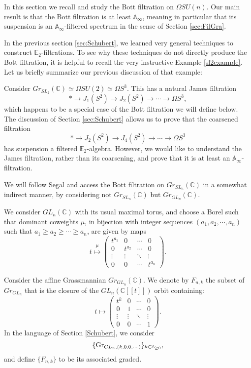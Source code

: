 In this section we recall and study the Bott filtration \cite{MitchellLoopGroup} on $\Omega SU(n)$.  Our main result is that the Bott filtration is at least $\mathbb{A}_\infty$, meaning in particular that its suspension is an $\mathbb{A}_\infty$-filtered spectrum in the sense of Section \ref{sec:FilGra}.

In the previous section \ref{sec:Schubert}, we learned very general techniques to construct $\mathbb{E}_2$-filtrations.  To see why these techniques do not directly produce the Bott filtration, it is helpful to recall the very instructive Example \ref{sl2example}.  Let us briefly summarize our previous discussion of that example:

\begin{rmk}
Consider $Gr_{SL_2}(\mathbb{C}) \simeq \Omega SU(2) \simeq \Omega S^3$.  This has a natural James filtration
$$* \longrightarrow J_1(S^2) \longrightarrow J_2(S^2) \longrightarrow \cdots \longrightarrow \Omega S^3,$$
which happens to be a special case of the Bott filtration we will define below.
The discussion of Section \ref{sec:Schubert} allows us to prove that the coarsened filtration
$$* \longrightarrow J_2(S^2) \longrightarrow J_4(S^2) \longrightarrow \cdots \longrightarrow \Omega S^3$$
has suspension a filtered $\mathbb{E}_2$-algebra.  However, we would like to understand the James filtration, rather than its coarsening, and prove that it is at least an $\mathbb{A}_\infty$-filtration.
\end{rmk}

We will follow Segal \cite{Segal} and access the Bott filtration on $Gr_{SL_n}(\mathbb{C})$ in a somewhat indirect manner, by considering not $Gr_{SL_n}(\mathbb{C})$ but $Gr_{GL_n}(\mathbb{C})$.

We consider $GL_n(\mathbb{C})$ with its usual maximal torus, and choose a Borel such that dominant coweights $\mu$, in bijection with integer sequences $(a_1,a_2,\cdots,a_n)$ such that $a_1 \ge a_2 \ge \cdots \ge a_n$, are given by maps
$$t \stackrel{\mu}{\mapsto} \left( \begin{array}{cccc} t^{a_1} & 0 & \cdots & 0 \\ 0 & t^{a_2} & \cdots & 0 \\ \vdots & \vdots & \ddots & \vdots \\ 0 & 0 & \cdots & t^{a_n} \end{array} \right).$$

\begin{dfn}
Consider the affine Grassmannian $Gr_{GL_n}(\mathbb{C})$.  We denote by $F_{n,k}$ the subset of $Gr_{GL_n}$ that is the closure of the $GL_n(\mathbb{C}[[t]])$ orbit containing:
$$t \mapsto \left( \begin{array}{cccc} t^k & 0 & \cdots & 0 \\ 0 & 1 & \cdots & 0 \\ \vdots & \vdots & \ddots & \vdots \\ 0 & 0 & \cdots & 1 \end{array} \right).$$
In the language of Section \ref{Schubert}, we consider 
$$\{ \operatorname{\mathrm{Gr}}_{GL_n, (k,0,0,\cdots)} \}_{k\in \mathbb{Z}_{\geq 0}},$$
and define $\{ F_{n,k}\}$ to be its associated graded.  
\end{dfn}

